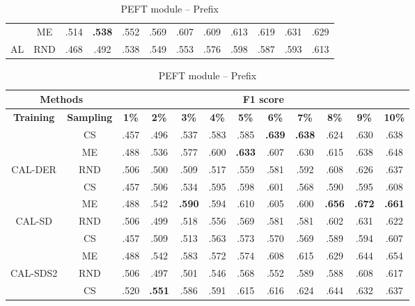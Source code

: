 \begin{table}[htbp]
\begin{subtable}{\linewidth}
\begin{tabular}{c|c|cccccccccc}
 & ME & .514 & \textbf{.538} & .552 & .569 & .607 & .609 & .613 & .619 & .631 & .629\\

\multirow{-3}{*}{\raggedright\arraybackslash AL} & RND & .468 & .492 & .538 & .549 & .553 & .576 & .598 & .587 & .593 & .613\\
\bottomrule
\end{tabular}
\end{subtable}
\vspace{1em}
\begin{subtable}{\linewidth}
\centering
\caption{PEFT module -- Prefix}

\begin{tabular}{c|c|cccccccccc}
\toprule
\multicolumn{2}{c|}{\textbf{Methods}} & \multicolumn{10}{c}{\textbf{F1 score}} \\
\midrule
\textbf{Training} & \textbf{Sampling} & \textbf{1\%} & \textbf{2\%} & \textbf{3\%} & \textbf{4\%} & \textbf{5\%} & \textbf{6\%} & \textbf{7\%} & \textbf{8\%} & \textbf{9\%} & \textbf{10\%}\\
\midrule
 & CS & .457 & .496 & .537 & .583 & .585 & \textbf{.639} & \textbf{.638} & .624 & .630 & .638\\

 & ME & .488 & .536 & .577 & .600 & \textbf{.633} & .607 & .630 & .615 & .638 & .648\\

\multirow{-3}{*}{\raggedright\arraybackslash CAL-DER} & RND & .506 & .500 & .509 & .517 & .559 & .581 & .592 & .608 & .626 & .637\\
\midrule
 & CS & .457 & .506 & .534 & .595 & .598 & .601 & .568 & .590 & .595 & .608\\

 & ME & .488 & .542 & \textbf{.590} & .594 & .610 & .605 & .600 & \textbf{.656} & \textbf{.672} & \textbf{.661}\\

\multirow{-3}{*}{\raggedright\arraybackslash CAL-SD} & RND & .506 & .499 & .518 & .556 & .569 & .581 & .581 & .602 & .631 & .622\\
\midrule
 & CS & .457 & .509 & .513 & .563 & .573 & .570 & .569 & .589 & .594 & .607\\

 & ME & .488 & .542 & .583 & .572 & .574 & .608 & .615 & .629 & .644 & .654\\

\multirow{-3}{*}{\raggedright\arraybackslash CAL-SDS2} & RND & .506 & .497 & .501 & .546 & .568 & .552 & .589 & .588 & .608 & .617\\
\midrule
 & CS & .520 & \textbf{.551} & .586 & .591 & .615 & .616 & .624 & .644 & .632 & .637\\


\end{tabular}
\end{subtable}
\end{table}
